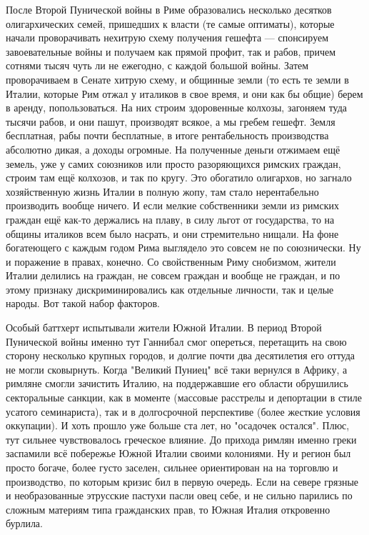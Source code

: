 После Второй Пунической войны в Риме образовались несколько десятков олигархических семей, пришедших к власти (те самые оптиматы), которые начали проворачивать нехитрую схему получения гешефта — спонсируем завоевательные войны и получаем как прямой профит, так и рабов, причем сотнями тысяч чуть ли не ежегодно, с каждой большой войны. Затем проворачиваем в Сенате хитрую схему, и общинные земли (то есть те земли в Италии, которые Рим отжал у италиков в свое время, и они как бы общие) берем в аренду, попользоваться. На них строим здоровенные колхозы, загоняем туда тысячи рабов, и они пашут, производят всякое, а мы гребем гешефт. Земля бесплатная, рабы почти бесплатные, в итоге рентабельность производства абсолютно дикая, а доходы огромные. На полученные деньги отжимаем ещё земель, уже у самих союзников или просто разоряющихся римских граждан, строим там ещё колхозов, и так по кругу. Это обогатило олигархов, но загнало хозяйственную жизнь Италии в полную жопу, там стало нерентабельно производить вообще ничего. И если мелкие собственники земли из римских граждан ещё как-то держались на плаву, в силу льгот от государства, то на общины италиков всем было насрать, и они стремительно нищали. На фоне богатеющего с каждым годом Рима выглядело это совсем не по союзнически. Ну и поражение в правах, конечно. Со свойственным Риму снобизмом, жители Италии делились на граждан, не совсем граждан и вообще не граждан, и по этому признаку дискриминировались как отдельные личности, так и целые народы. Вот такой набор факторов.


Особый баттхерт испытывали жители Южной Италии. В период Второй Пунической войны именно тут Ганнибал смог опереться, перетащить на свою сторону несколько крупных городов, и долгие почти два десятилетия его оттуда не могли сковырнуть. Когда "Великий Пуниец" всё таки вернулся в Африку, а римляне смогли зачистить Италию, на поддержавшие его области обрушились секторальные санкции, как в моменте (массовые расстрелы и депортации в стиле усатого семинариста), так и в долгосрочной перспективе (более жесткие условия оккупации). И хоть прошло уже больше ста лет, но "осадочек остался". Плюс, тут сильнее чувствовалось греческое влияние. До прихода римлян именно греки заспамили всё побережье Южной Италии своими колониями. Ну и регион был просто богаче, более густо заселен, сильнее ориентирован на на торговлю и производство, по которым кризис бил в первую очередь. Если на севере грязные и необразованные этрусские пастухи пасли овец себе, и не сильно парились по сложным материям типа гражданских прав, то Южная Италия откровенно бурлила.


